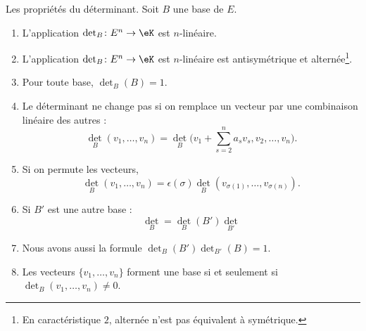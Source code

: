 \begin{lemma}     \label{LemJMWCooELZuho}
    Les propriétés du déterminant. Soit \( B\) une base de \( E\).
    \begin{enumerate}
        \item\label{ITEMooAHOHooDZgtSB}
            L'application \( \det_B\colon E^n\to \eK\) est \( n\)-linéaire.
        \item\label{ITEMooTXXBooBmDtzd}
            L'application \( \det_B\colon E^n\to \eK\) est \( n\)-linéaire est antisymétrique et alternée\footnote{En caractéristique \( 2\), alternée n'est pas équivalent à symétrique.}.
        \item   \label{ITEMooNFJTooTqGoPr}
            Pour toute base, \( \det_B(B)=1\).
        \item   \label{ITEMooALRQooDvBzDQ}
            Le déterminant ne change pas si on remplace un vecteur par une combinaison linéaire des autres :
            \begin{equation}
                \det_B(v_1,\ldots, v_n)=\det_B\big( v_1+\sum_{s=2}^na_sv_s,v_2,\ldots, v_n \big).
            \end{equation}
        \item   \label{ITEMooQTTRooMbzqyW}
            Si on permute les vecteurs,
            \begin{equation}
                \det_B(v_1,\ldots, v_n)=\epsilon(\sigma)\det_B(v_{\sigma(1)},\ldots, v_{\sigma(n)}).
            \end{equation}
        \item   \label{ITEMooIPIDooTrerVF}
            Si \( B'\) est une autre base :
            \begin{equation}        \label{EqAWICooBLTTOY}
                \det_B=\det_B(B')\det_{B'}
            \end{equation}
        \item   \label{ITEMooXKTAooXynFTE}
            Nous avons aussi la formule \( \det_{B}(B')\det_{B'}(B)=1\).
        \item\label{ItemDWFLooDUePAf}
            Les vecteurs \( \{ v_1,\ldots, v_n \}\) forment une base si et seulement si \( \det_B(v_1,\ldots, v_n)\neq 0\).
    \end{enumerate}
\end{lemma}

